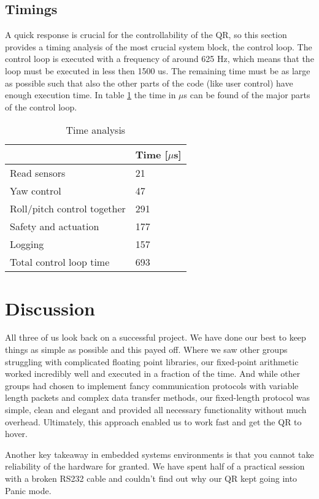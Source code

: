 \documentclass[a4paper]{article}
\begin{document}
\subsection{Timings}
A quick response is crucial for the controllability of the QR, so this section provides a timing analysis of the most crucial system block, the control loop. The control loop is executed with a frequency of around 625 Hz, which means that the loop must be executed in less then 1500 us. The remaining time must be as large as possible such that also the other parts of the code (like user control) have enough execution time.
In table \ref{tab:timings} the time in $\mu$s can be found of the major parts of the control loop. 

\begin{table}[h!]
\centering
\caption{Time analysis}
\label{tab:timings}
\begin{tabular}{l|l}
       & \textbf{Time {[}$\mu$s{]}} \\ \hline
Read sensors              & 21      \\
Yaw control                 & 47        \\
Roll/pitch control  together & 291      \\
Safety and actuation      &  177    \\
Logging                   &  157  \\ \hline
Total control loop time & 693
\end{tabular}
\end{table}


\section{Discussion}\label{sec:conc}
All three of us look back on a successful project. We have done our best to keep things as simple as possible and this payed off. Where we saw other groups struggling with complicated floating point libraries, our fixed-point arithmetic worked incredibly well and executed in a fraction of the time. And while other groups had chosen to implement fancy communication protocols with variable length packets and complex data transfer methods, our fixed-length protocol was simple, clean and elegant and provided all necessary functionality without much overhead. Ultimately, this approach enabled us to work fast and get the QR to hover.

Another key takeaway in embedded systems environments is that you cannot take reliability of the hardware for granted. We have spent half of a practical session with a broken RS232 cable and couldn't find out why our QR kept going into Panic mode.
\end{document}
